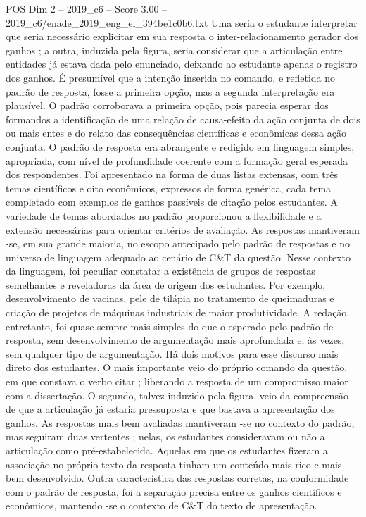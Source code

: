 \begin{textsample}{POS Dim 2 – 2019\_c6 – Score 3.00 – 2019\_c6/enade\_2019\_eng\_el\_394be1c0b6.txt}
Uma seria o estudante interpretar que seria necessário explicitar em sua resposta o inter-relacionamento gerador dos ganhos ; a outra, induzida pela figura, seria considerar que a articulação entre entidades já estava dada pelo enunciado, deixando ao estudante apenas o registro dos ganhos.
É presumível que a intenção inserida no comando, e refletida no padrão de resposta, fosse a primeira opção, mas a segunda interpretação era plausível.
O padrão corroborava a primeira opção, pois parecia esperar dos formandos a identificação de uma relação de causa-efeito da ação conjunta de dois ou mais entes e do relato das consequências científicas e econômicas dessa ação conjunta.
O padrão de resposta era abrangente e redigido em linguagem simples, apropriada, com nível de profundidade coerente com a formação geral esperada dos respondentes.
Foi apresentado na forma de duas listas extensas, com três temas científicos e oito econômicos, expressos de forma genérica, cada tema completado com exemplos de ganhos passíveis de citação pelos estudantes.
A variedade de temas abordados no padrão proporcionou a flexibilidade e a extensão necessárias para orientar critérios de avaliação.
As respostas mantiveram -se, em sua grande maioria, no escopo antecipado pelo padrão de respostas e no universo de linguagem adequado ao cenário de C\&T da questão.
Nesse contexto da linguagem, foi peculiar constatar a existência de grupos de respostas semelhantes e reveladoras da área de origem dos estudantes.
Por exemplo, desenvolvimento de vacinas, pele de tilápia no tratamento de queimaduras e criação de projetos de máquinas industriais de maior produtividade.
A redação, entretanto, foi quase sempre mais simples do que o esperado pelo padrão de resposta, sem desenvolvimento de argumentação mais aprofundada e, às vezes, sem qualquer tipo de argumentação.
Há dois motivos para esse discurso mais direto dos estudantes.
O mais importante veio do próprio comando da questão, em que constava o verbo citar ; liberando a resposta de um compromisso maior com a dissertação.
O segundo, talvez induzido pela figura, veio da compreensão de que a articulação já estaria pressuposta e que bastava a apresentação dos ganhos.
As respostas mais bem avaliadas mantiveram -se no contexto do padrão, mas seguiram duas vertentes ; nelas, os estudantes consideravam ou não a articulação como pré-estabelecida.
Aquelas em que os estudantes fizeram a associação no próprio texto da resposta tinham um conteúdo mais rico e mais bem desenvolvido.
Outra característica das respostas corretas, na conformidade com o padrão de resposta, foi a separação precisa entre os ganhos científicos e econômicos, mantendo -se o contexto de C\&T do texto de apresentação.

\end{textsample}
